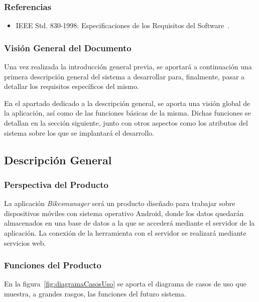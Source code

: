 \subsubsection{Referencias}

\begin{itemize}
	\item IEEE Std. 830-1998: Especificaciones de los Requisitos del Software~\cite{IE830}.
\end{itemize}

\subsubsection{Visión General del Documento}

Una vez realizada la introducción general previa, se aportará a continuación una primera descripción general del sistema a desarrollar para, finalmente, pasar a detallar los requisitos específicos del mismo.

En el apartado dedicado a la descripción general, se aporta una visión global de la aplicación, así como de las funciones básicas de la misma. Dichas funciones se detallan en la sección siguiente, junto con otros aspectos como los atributos del sistema sobre los que se implantará el desarrollo.

\subsection{Descripción General}

\subsubsection{Perspectiva del Producto}

La aplicación \emph{Bikesmanager} será un producto diseñado para trabajar sobre dispositivos móviles con sistema operativo Android, donde los datos quedarán almacenados en una base de datos a la que se accederá mediante el servidor de la aplicación. La conexión de la herramienta con el servidor se realizará mediante servicios web.

\subsubsection{Funciones del Producto}

En la figura~\ref{fig:diagramaCasosUso} se aporta el diagrama de casos de uso que muestra, a grandes rasgos, las funciones del futuro sistema.

